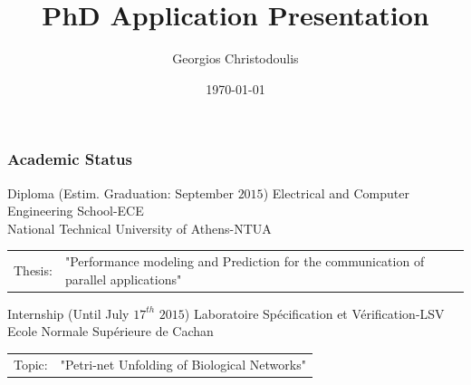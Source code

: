 \documentclass{beamer}
\title[George Christodoulis]{PhD Application Presentation} %
\author{Georgios Christodoulis} %
\institute[NTUA] %
{
National Technical University of Athens \\ %
\medskip
\textit{gchristodoulis@gmail.com} %
}
\date{\today} %
\begin{document}
\begin{frame}
\titlepage %
\end{frame}

\begin{frame}
\frametitle{Academic Status}
\begin{block}{Diploma (Estim. Graduation: September $2015$)}
Electrical and Computer Engineering School-ECE\\
National Technical University of Athens-NTUA\\
\begin{tabular}{l p{200pt}}
Thesis:&"Performance modeling and Prediction for the communication of parallel applications"
\end{tabular}
\end{block}

\begin{block}{Internship (Until July $17^{th}$ $2015$)}
Laboratoire Spécification et Vérification-LSV\\
Ecole Normale Supérieure de Cachan\\
\begin{tabular}{l p{200pt}}
Topic:&"Petri-net Unfolding of Biological Networks"
\end{tabular}
\end{block}
\end{frame}
\end{document}
